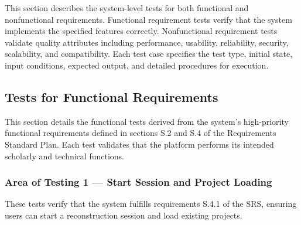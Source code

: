 \documentclass[12pt, titlepage]{article}
\begin{document}
This section describes the system-level tests for both functional and nonfunctional requirements. Functional requirement tests verify that the system implements the specified features correctly. Nonfunctional requirement tests validate quality attributes including performance, usability, reliability, security, scalability, and compatibility. Each test case specifies the test type, initial state, input conditions, expected output, and detailed procedures for execution.

\subsection{Tests for Functional Requirements}

This section details the functional tests derived from the system’s high-priority functional requirements defined in sections S.2 and S.4 of the Requirements Standard Plan. Each test validates that the platform performs its intended scholarly and technical functions.

\subsubsection{Area of Testing 1 — Start Session and Project Loading}

These tests verify that the system fulfills requirements S.4.1 of the SRS, ensuring users can start a reconstruction session and load existing projects.
\end{document}
